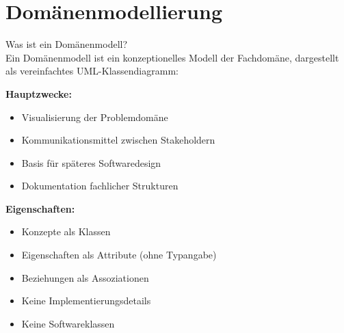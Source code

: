 \section{Domänenmodellierung}

\begin{concept}{Was ist ein Domänenmodell?}\\
Ein Domänenmodell ist ein konzeptionelles Modell der Fachdomäne, dargestellt als vereinfachtes UML-Klassendiagramm:

\textbf{Hauptzwecke:}
\begin{itemize}
    \item Visualisierung der Problemdomäne
    \item Kommunikationsmittel zwischen Stakeholdern
    \item Basis für späteres Softwaredesign
    \item Dokumentation fachlicher Strukturen
\end{itemize}

\textbf{Eigenschaften:}
\begin{itemize}
    \item Konzepte als Klassen
    \item Eigenschaften als Attribute (ohne Typangabe)
    \item Beziehungen als Assoziationen
    \item Keine Implementierungsdetails
    \item Keine Softwareklassen
\end{itemize}
\end{concept}

